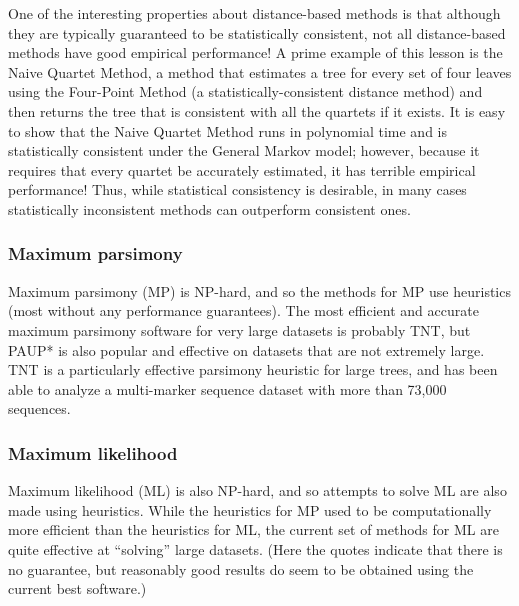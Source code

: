 One of the interesting properties about distance-based 
methods is that although they are typically guaranteed 
to be statistically consistent, not all distance-based 
methods have good empirical performance! A prime example 
of this lesson is the Naive Quartet Method, a method that 
estimates a tree for every set of four leaves using the 
Four-Point Method (a statistically-consistent distance method) 
and then returns the tree that is consistent with all the 
quartets if it exists. It is easy to show that the Naive 
Quartet Method runs in polynomial time and is statistically 
consistent under the General Markov model; however, because 
it requires that every quartet be accurately estimated, 
it has terrible empirical performance! Thus, while 
statistical consistency is desirable, in many cases statistically 
inconsistent methods can outperform consistent ones.

\subsubsection{Maximum parsimony}
Maximum parsimony (MP) is NP-hard, and so the methods for 
MP use heuristics (most without any performance guarantees). 
The most efficient and accurate maximum parsimony software 
for very large datasets is probably TNT, but PAUP* is also 
popular and effective on datasets that are not extremely large. 
TNT is a particularly effective parsimony heuristic for 
large trees, and has been able to analyze a multi-marker 
sequence dataset with more than 73,000 sequences.

\subsubsection{Maximum likelihood}
Maximum likelihood (ML) is also NP-hard, and so attempts to 
solve ML are also made using heuristics. While the heuristics 
for MP used to be computationally more efficient than the 
heuristics for ML, the current set of methods for ML are 
quite effective at ``solving'' large datasets. (Here the 
quotes indicate that there is no guarantee, but reasonably 
good results do seem to be obtained using the current best software.)

